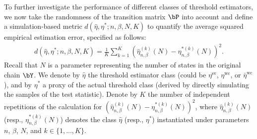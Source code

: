 \documentclass[10pt, twocolumn]{IEEEtran}
\begin{document}
{To further investigate the performance of different classes of
  threshold estimators, we now take the randomness of the transition
  matrix $\bP$ into account and define a simulation-based metric
  $d\left( {\hat \eta ,\eta^{*} ;n, \beta, N, K} \right)$ to quantify
  the average squared empirical estimation error, specified as follows:
  \begin{align}
	d\left( {\hat \eta ,\eta^{*} ;n, \beta, N, K} \right) = \frac{1}{{K}}\sum\limits_{k = 1}^{K} { { {\left( {\hat \eta^{\scriptscriptstyle{(k)}}_{n,\beta} \left( {N} \right) - \eta^{\scriptscriptstyle{*(k)}}_{n,\beta} \left( {N} \right)} \right)^2} } }.    \label{accuracy-metric}
\end{align}
Recall that $N$ is a parameter representing the number of states in the
original chain $\bY$. We denote by $\hat \eta$ the threshold estimator
class (could be $\eta^{\text{sv}}$, $\eta^{\text{wc}}$, or $\bar
\eta^{\text{wc}}$), and by $\eta^{*}$ a proxy of the actual threshold
class (derived by directly simulating the samples of the test
statistic). Denote by $K$ the number of independent repetitions of the
calculation for $( {\hat \eta^{\scriptscriptstyle{(k)}}_{n,\beta} ( {N}
  ) - \eta^{\scriptscriptstyle{*(k)}}_{n,\beta} ( {N} )} )^2$, where
$\hat \eta^{\scriptscriptstyle{(k)}}_{n,\beta} ( {N} )$
(resp., $\eta^{\scriptscriptstyle{*(k)}}_{n,\beta} ( {N} )$)
denotes the class $\hat \eta$ (resp., $\eta^{*}$) instantiated under
parameters $n$, $\beta$, $N$, and $k \in \{1, \ldots, K\}$.}
\end{document}
